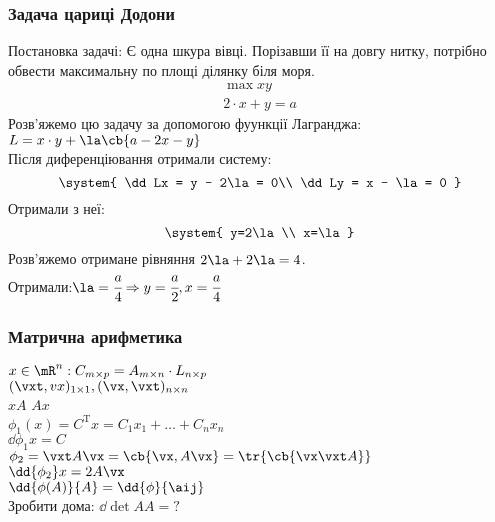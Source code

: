 \subsubsection{Задача цариці Додони}
Постановка задачі: Є одна шкура вівці. Порізавши її на довгу нитку, потрібно обвести максимальну по площі ділянку біля моря.
\begin{eqnarray}
\max xy\\
2\cdot x+ y  = a
\end{eqnarray}
Розв’яжемо цю задачу за допомогою фуункції Лагранджа: $L=x\cdot y +\la\cb{a-2x-y}$\\
Після диференціювання отримали систему:
\begin{equation}
\system{
\dd Lx = y - 2\la = 0\\
\dd Ly = x - \la = 0
}
\end{equation}
Отримали з неї: \\
\begin{equation}
\system{
y=2\la \\
x=\la
}
\end{equation}
Розв’яжемо отримане рівняння $2\la+2\la=4$.\\
Отримали:$\la = \cfrac a4 \Rightarrow y=\cfrac a2,x=\cfrac a4$
\subsubsection{Матрична арифметика}
$x\in\mR^n: C_{m\times p} = A_{m\times n} \cdot L_{n\times p}$\\
$(\vxt,vx)_{1\times1},(\vx,\vxt)_{n\times n}$\\
$xA$ %
$Ax$ \\
$\phi_1(x)=C^\mathrm{T}x = C_1x_1+\ldots + C_nx_n$\\
$\dd{\phi_1}{x} = C$\\
$\phi_2  = \vxt A \vx = \cb{\vx,A\vx} = \tr{\cb{\vx\vxt A}}$\\
$\dd{\phi_2}x = 2A\vx$\\
$\dd{\phi(A)}{A} = \dd{\phi}{\aij}$\\
Зробити дома: $\dd{\det A}{A}=?$\\
